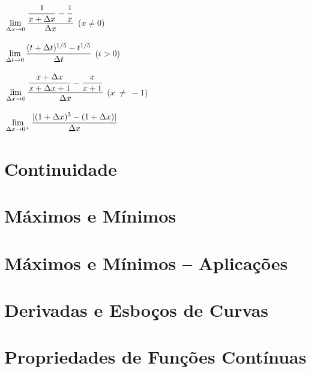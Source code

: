 \begin{sectionproblems}
%
        {$\dslim{\Dx \to 0} \dfrac{\dfrac{1}{x + \Dx}-\dfrac{1}{x}}{\Dx}$ \;
         ($x \ne 0$)}

%
        {$\dslim{\Dt \to 0} \dfrac{(t + \Dt)^{1/5} - t^{1/5}}{\Dt}$ \; ($t > 0$)}

%
        {$\dslim{\Dx \to 0} \dfrac{\dfrac{x + \Dx}{x + \Dx + 1}-\dfrac{x}{x+1}}{\Dx}$ \; ($x~\ne~-1$)}

%
        {$\dslim{\Dx \to 0^+} \dfrac{|(1+\Dx)^3-(1+\Dx)|}{\Dx}$}


\end{sectionproblems}

\section{Continuidade}
\label{sec:continuity}

\section{Máximos e Mínimos}
\label{sec:maxmin}

\section{Máximos e Mínimos -- Aplicações}
\label{sec:maxminappl}

\section{Derivadas e Esboços de Curvas}
\label{sec:derivsketch}

\section{Propriedades de Funções Contínuas}
\label{sec:propcont}

\begin{chapterproblems}
\end{chapterproblems}
